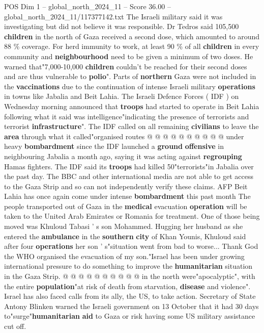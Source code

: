 \begin{textsample}{POS Dim 1 – global\_north\_2024\_11 – Score 36.00 – global\_north\_2024\_11/117377142.txt}
The Israeli military said it was investigating but did not believe it was responsible.
Dr Tedros said 105,500 \textbf{children} in the north of Gaza received a second dose, which amounted to around 88 \% coverage.
For herd immunity to work, at least 90 \% of all \textbf{children} in every community and \textbf{neighbourhood} need to be given a minimum of two doses.
He warned that"7,000-10,000 \textbf{children} couldn't be reached for their second doses and are thus vulnerable to \textbf{polio}".
Parts of \textbf{northern} Gaza were not included in the \textbf{vaccinations} due to the continuation of intense Israeli military \textbf{operations} in towns like Jabalia and Beit Lahia.
The Israeli Defence Forces ( IDF ) on Wednesday morning announced that \textbf{troops} had started to operate in Beit Lahia following what it said was intelligence"indicating the presence of terrorists and terrorist \textbf{infrastructure}".
The IDF called on all remaining \textbf{civilians} to leave the \textbf{area} through what it called"organised routes @ @ @ @ @ @ @ @ @ @ under heavy \textbf{bombardment} since the IDF launched a \textbf{ground} \textbf{offensive} in neighbouring Jabalia a month ago, saying it was acting against \textbf{regrouping} Hamas fighters.
The IDF said its \textbf{troops} had killed 50"terrorists"in Jabalia over the past day.
The BBC and other international media are not able to get access to the Gaza Strip and so can not independently verify these claims.
AFP Beit Lahia has once again come under intense \textbf{bombardment} this past month The people transported out of Gaza in the \textbf{medical} evacuation \textbf{operation} will be taken to the United Arab Emirates or Romania for treatment.
One of those being moved was Khuloud Tabasi ' s son Mohammed.
Hugging her husband as she entered the \textbf{ambulance} in the \textbf{southern} \textbf{city} of Khan Younis, Khuloud said after four \textbf{operations} her son ' s"situation went from bad to worse...
Thank God the WHO organised the evacuation of my son."Israel has been under growing international pressure to do something to improve the \textbf{humanitarian} situation in the Gaza Strip. @ @ @ @ @ @ @ @ @ @ in the north were"apocalyptic", with the entire \textbf{population}"at risk of death from starvation, \textbf{disease} and violence".
Israel has also faced calls from its ally, the US, to take action.
Secretary of State Antony Blinken warned the Israeli government on 13 October that it had 30 days to"surge"\textbf{humanitarian} \textbf{aid} to Gaza or risk having some US military assistance cut off.

\end{textsample}
